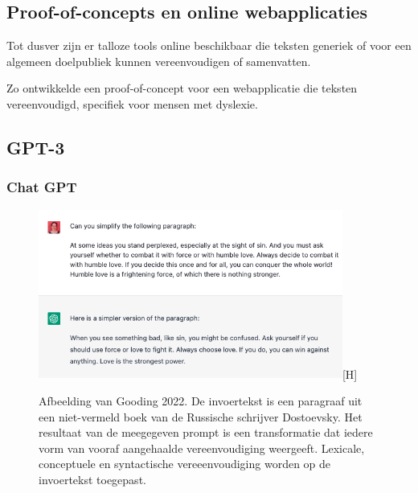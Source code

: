 
\subsection{Proof-of-concepts en online webapplicaties}

Tot dusver zijn er talloze tools online beschikbaar die teksten generiek of voor een algemeen doelpubliek kunnen vereenvoudigen of samenvatten. 

Zo ontwikkelde \textcite{Bingel2018} een proof-of-concept voor een webapplicatie die teksten vereenvoudigd, specifiek voor mensen met dyslexie.



\subsection{GPT-3}

\subsubsection{Chat GPT}



\begin{figure}
	\includegraphics[width=10cm]{img/chatgpt-example-simplification-gooding.png}[H]
	\caption{Afbeelding van Gooding 2022. De invoertekst is een paragraaf uit een niet-vermeld boek van de Russische schrijver Dostoevsky. Het resultaat van de meegegeven prompt is een transformatie dat iedere vorm van vooraf aangehaalde vereenvoudiging weergeeft. Lexicale, conceptuele en syntactische vereeenvoudiging worden op de invoertekst toegepast.}
\end{figure}

